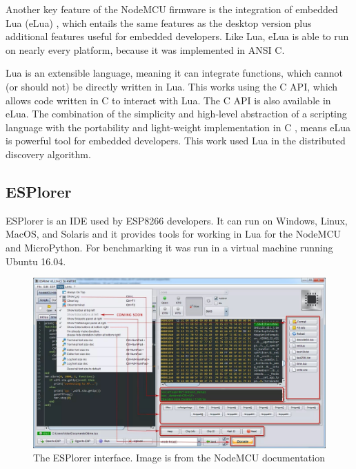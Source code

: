 Another key feature of the NodeMCU firmware is the integration of embedded Lua (eLua) \cite{Zeroday.2017}, which entails the same features as the desktop version plus additional features useful for embedded developers. Like Lua, eLua is able to run on nearly every platform, because it was implemented in ANSI C. \cite{Marinescu.} 

Lua is an extensible language, meaning it can integrate functions, which cannot (or should not) be directly written in Lua. This works using the C API, which allows code written in C to interact with Lua. The C API is also available in eLua. The combination of the simplicity and high-level abstraction of a scripting language with the portability and light-weight implementation in C \cite{luaHandbook}, means eLua is powerful tool for embedded developers. This work used Lua in the distributed discovery algorithm.




\subsection{ESPlorer}
ESPlorer is an IDE used by ESP8266 developers. It can run on Windows, Linux, MacOS, and Solaris and it provides tools for working in Lua for the NodeMCU and MicroPython. For benchmarking it was run in a virtual machine running Ubuntu 16.04.

\begin{figure}[h]
\centering
\includegraphics[width=\textwidth]{Figures/ESPlorer.jpg}
\caption{The ESPlorer interface. Image is from the NodeMCU documentation\cite{Zeroday.2017}}
\end{figure}

